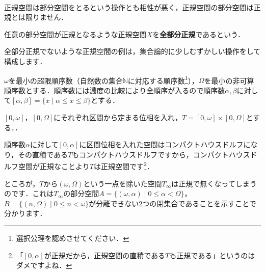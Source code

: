 　\par
正規空間は部分空間をとるという操作とも相性が悪く，正規空間の部分空間は正規とは限りません．
\begin{defi}[全部分正規]
任意の部分空間が正規となるような正規空間$X$を{\bf 全部分正規}であるという．
\end{defi}
全部分正規でないような正規空間の例は，集合論的に少しむずかしい操作をして構成します．
\begin{defi}
$\omega$を最小の超限順序数（自然数の集合$\mathbb{N}$に対応する順序数\footnote{選択公理を認めさせてください．}），$\Omega$を最小の非可算順序数とする．順序数には濃度の比較により全順序が入るので順序数$\alpha,\beta$に対して$[\alpha,\beta]=\{x\mid \alpha\leq x\leq \beta\}$とする．
\end{defi}
\begin{ex}[Tychonoffの板]
$[0,\omega]$，$[0,\Omega]$にそれぞれ区間から定まる位相を入れ，$T=[0,\omega]\times[0,\Omega]$とする．．
\end{ex}
順序数$\alpha$に対して$[0,\alpha]$に区間位相を入れた空間はコンパクトハウスドルフになり，その直積である$T$もコンパクトハウスドルフですから，コンパクトハウスドルフ空間が正規なことより$T$は正規空間です\footnote{「$[0,\alpha]$が正規だから，正規空間の直積である$T$も正規である」というのはダメですよね．}．\par
ところが，$T$から$(\omega,\Omega)$という一点を除いた空間$T_{\infty}$は正規で無くなってしまうのです．これは$T_{\infty}$の部分空間$A=\{(\omega,\alpha)\mid 0\leq \alpha<\Omega\}$，$B=\{ (n,\Omega)\mid 0\leq n<\omega \}$が分離できない$2$つの閉集合であることを示すことで分かります．

